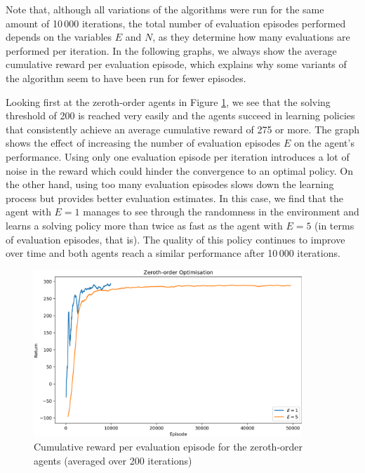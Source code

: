 \documentclass[10pt]{article}
\begin{document}
Note that, although all variations of the algorithms were run for the same amount of
10\,000 iterations, the total number of evaluation episodes performed depends on the
variables $E$ and $N$, as they determine how many evaluations are performed per
iteration.
In the following graphs, we always show the average cumulative reward per evaluation
episode, which explains why some variants of the algorithm seem to have been run for
fewer episodes.

Looking first at the zeroth-order agents in Figure \ref{fig:zeroth_order}, we see that
the solving threshold of 200 is reached very easily and the agents succeed in learning
policies that consistently achieve an average cumulative reward of 275 or more.
The graph shows the effect of increasing the number of evaluation episodes $E$ on the
agent's performance.
Using only one evaluation episode per iteration introduces a lot of noise in the reward
which could hinder the convergence to an optimal policy.
On the other hand, using too many evaluation episodes slows down the learning process but
provides better evaluation estimates.
In this case, we find that the agent with $E=1$ manages to see through the randomness in
the environment and learns a solving policy more than twice as fast as the agent with
$E=5$ (in terms of evaluation episodes, that is).
The quality of this policy continues to improve over time and both agents reach a similar
performance after 10\,000 iterations.

\begin{figure}[h] \centering
    \includegraphics[width=0.9\textwidth]{checkpoints/FINAL/zeroth_order.png}
    \caption{Cumulative reward per evaluation episode for the zeroth-order agents (averaged
        over 200 iterations)}
    \label{fig:zeroth_order}
\end{figure}
\end{document}
